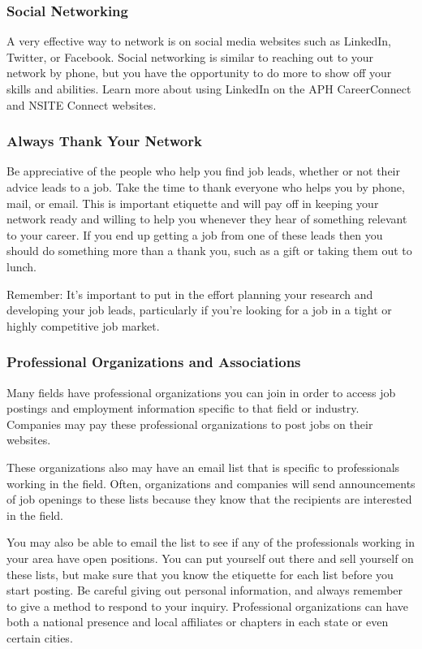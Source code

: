 \subsubsection*{Social Networking}

A very effective way to network is on social media websites such as LinkedIn, Twitter, or Facebook. Social networking is similar to reaching out to your network by phone, but you have the opportunity to do more to show off your skills and abilities. Learn more about using LinkedIn on the APH CareerConnect and NSITE Connect websites.

\subsubsection*{Always Thank Your Network}

Be appreciative of the people who help you find job leads, whether or not their advice leads to a job. Take the time to thank everyone who helps you by phone, mail, or email. This is important etiquette and will pay off in keeping your network ready and willing to help you whenever they hear of something relevant to your career. If you end up getting a job from one of these leads then you should do something more than a thank you, such as a gift or taking them out to lunch.

Remember: It's important to put in the effort planning your research and developing your job leads, particularly if you're looking for a job in a tight or highly competitive job market.

\subsubsection*{Professional Organizations and Associations}

Many fields have professional organizations you can join in order to access job postings and employment information specific to that field or industry. Companies may pay these professional organizations to post jobs on their websites.

These organizations also may have an email list that is specific to professionals working in the field. Often, organizations and companies will send announcements of job openings to these lists because they know that the recipients are interested in the field.

You may also be able to email the list to see if any of the professionals working in your area have open positions. You can put yourself out there and sell yourself on these lists, but make sure that you know the etiquette for each list before you start posting. Be careful giving out personal information, and always remember to give a method to respond to your inquiry. Professional organizations can have both a national presence and local affiliates or chapters in each state or even certain cities.

